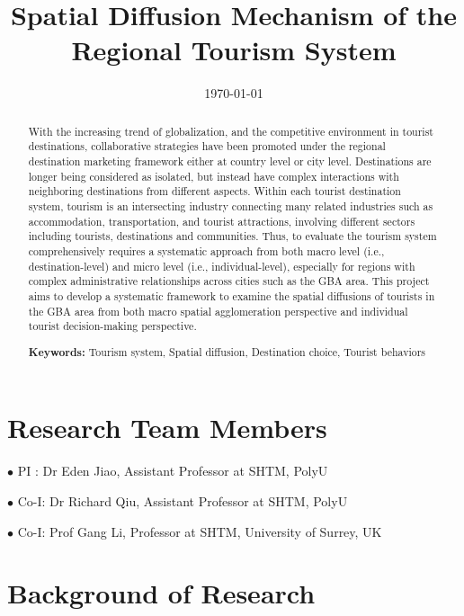 \documentclass[11pt,a4paper]{amsart}
\theoremstyle{plain}
\theoremstyle{definition}
\begin{document}
\title{S\lowercase{patial} D\lowercase{iffusion} M\lowercase{echanism of the} R\lowercase{egional} T\lowercase{ourism} S\lowercase{ystem}}
\date{\today}
\begin{abstract}
	With the increasing trend of globalization, and the competitive environment in tourist destinations, collaborative strategies have been promoted under the regional destination marketing framework either at country level or city level. Destinations are longer being considered as isolated, but instead have complex interactions with neighboring destinations from different aspects. Within each tourist destination system, tourism is an intersecting industry connecting many related industries such as accommodation, transportation, and tourist attractions, involving different sectors including tourists, destinations and communities. Thus, to evaluate the tourism system comprehensively requires a systematic approach from both macro level (i.e., destination-level) and micro level (i.e., individual-level), especially for regions with complex administrative relationships across cities such as the GBA area. This project aims to develop a systematic framework to examine the spatial diffusions of tourists in the GBA area from both macro spatial agglomeration perspective and individual tourist decision-making perspective.

\noindent \textbf{Keywords:} Tourism system, Spatial diffusion, Destination choice, Tourist behaviors
\end{abstract}
		
\maketitle
\tableofcontents

\section{Research Team Members}
$\bullet$ PI : Dr Eden Jiao, Assistant Professor at SHTM, PolyU

$\bullet$ Co-I: Dr Richard Qiu, Assistant Professor at SHTM, PolyU

$\bullet$ Co-I: Prof Gang Li, Professor at SHTM, University of Surrey, UK

\section{Background of Research}
\end{document}
